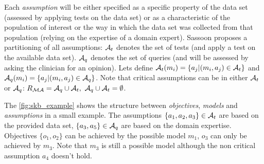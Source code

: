Each \textit{assumption} will be either specified as a specific property of the data set (assessed by applying tests on the data set) or as a characteristic of the population of interest or the way in which the data set was collected from that population (relying on the expertise of a domain expert). Sassoon proposes a partitioning of all assumptions: $\mathcal{A}_t$ denotes the set of tests (and apply a test on the available data set). $\mathcal{A}_q$ denotes the set of queries (and will be assessed by asking the clinician for an opinion). Lets define $\mathcal{A}_t(m_i)= \{a_j| (m_i, a_j) \in \mathcal{A}_t\}$ and $\mathcal{A}_q(m_i)= \{a_j| (m_i, a_j) \in \mathcal{A}_q\}$. Note that critical assumptions can be in either $\mathcal{A}_t$ or $\mathcal{A}_q$: $ R_{\mathcal{M}\mathcal{A}} = \mathcal{A}_q \cup \mathcal{A}_t, ~\mathcal{A}_q \cup \mathcal{A}_t = \emptyset$. 

The \autoref{fig:skb_example} shows the structure between \textit{objectives}, \textit{models} and \textit{assumptions} in a small example. The assumptions $\{a_1, a_2, a_3\} \in \mathcal{A}_t$ are based on the provided data set, $\{a_3, a_5\} \in \mathcal{A}_q$ are based on the domain expertise. Objectives $\{o_1, o_2\}$ can  be achieved by the possible model $m_1$, $o_3$ can only be achieved by $m_3$. Note that $m_3$ is still a possible model although the non critical assumption $a_4$ doesn't hold.

